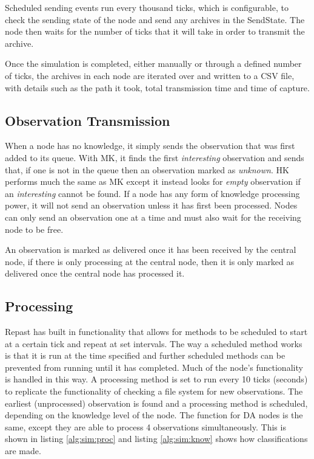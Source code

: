 	Scheduled sending events run every thousand ticks, which is configurable, to check the sending state of the node and send any archives in the SendState. The node then waits for the number of ticks that it will take in order to transmit the archive.
	
	Once the simulation is completed, either manually or through a defined number of ticks, the archives in each node are iterated over and written to a CSV file, with details such as the path it took, total transmission time and time of capture.


\subsection{Observation Transmission}
When a node has no knowledge, it simply sends the observation that was first added to its queue. With MK, it finds the first \textit{interesting} observation and sends that, if one is not in the queue then an observation marked as \textit{unknown}. HK performs much the same as MK except it instead looks for \textit{empty} observation if an \textit{interesting} cannot be found. If a node has any form of knowledge processing power, it will not send an observation unless it has first been processed. Nodes can only send an observation one at a time and must also wait for the receiving node to be free.

An observation is marked as delivered once it has been received by the central node, if there is only processing at the central node, then it is only marked as delivered once the central node has processed it.

\subsection{Processing}
Repast has built in functionality that allows for methods to be scheduled to start at a certain tick and repeat at set intervals. The way a scheduled method works is that it is run at the time specified and further scheduled methods can be prevented from running until it has completed. Much of the node's functionality is handled in this way. A processing method is set to run every 10 ticks (seconds) to replicate the functionality of checking a file system for new observations. The earliest (unprocessed) observation is found and a processing method is scheduled, depending on the knowledge level of the node. The function for DA nodes is the same, except they are able to process 4 observations simultaneously. This is shown in listing \ref{alg:sim:proc} and listing \ref{alg:sim:know} shows how classifications are made. 

